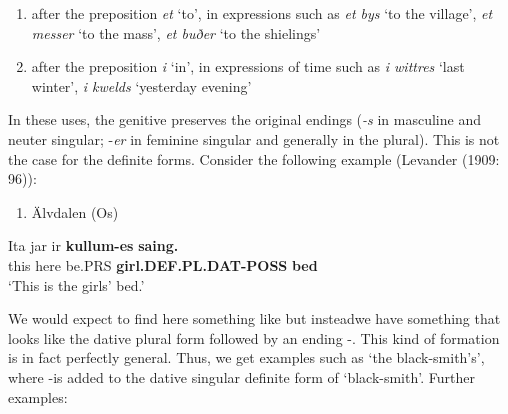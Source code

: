 \begin{enumerate} %
\item 
after the preposition \textit{et} ‘to’, in expressions such as \textit{et bys} ‘to the village’, \textit{et messer} ‘to the mass’, \textit{et buðer} ‘to the shielings’

\item 
after the preposition \textit{i} ‘in’, in expressions of time such as \textit{i wittres} ‘last winter’, \textit{i kwelds }‘yesterday evening’

\end{enumerate} %
In these uses, the genitive preserves the original endings (\textit{\nobreakdash-s }in masculine and neuter singular; \nobreakdash-\textit{er} in feminine singular and generally in the plural). This is not the case for the definite forms. Consider the following example (Levander (1909: 96)):

\begin{enumerate} %
\item 
Älvdalen (Os)

\end{enumerate} %
\ea\label{}
\gll Ita  jar  ir  \textbf{kullum-es}\textbf{  saing.}\\


this  here  be.PRS  \textbf{girl.DEF.PL.DAT-POSS} \textbf{bed}\\ %


‘This is the girls’ bed.’
\z


We would expect to find here something like but instead\textstyleLinguisticExample{ }we have something that looks like the dative plural form  followed by an ending \nobreakdash-. This kind of formation is in fact perfectly general. Thus, we get examples such as  ‘the black-smith’s’, where \nobreakdash-is added to the dative singular definite form  of  ‘black-smith’. Further examples:

